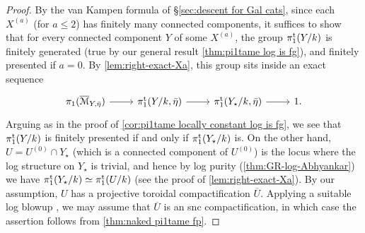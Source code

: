 \begin{proof}
By the van Kampen formula of \S\ref{sec:descent for Gal cats}, since each $X^{(a)}$ (for $a\leq 2$) has finitely many connected components, it suffices to show that for every connected component $Y$ of some $X^{(a)}$, the group $\pi_1^{\mathrm{t}}(Y/k)$ is finitely generated (true by our general result \cref{thm:pi1tame log is fg}), and finitely presented if $a=0$. By \cref{lem:right-exact-Xa}, this group sits inside an exact sequence 
\[
    \begin{tikzcd}
        \pi_1(\overline{\cM}_{Y,\bar\eta}) \ar[r] & \pitame(Y/k,\bar\eta)\ar[r] & \pitame(Y_\star/k,\bar\eta)\ar[r] & 1.
    \end{tikzcd}
\]
Arguing as in the proof of \cref{cor:pi1tame locally constant log is fg}, we see that $\pi_1^{\mathrm{t}}(Y/k)$ is finitely presented if and only if $\pi_1^{\mathrm{t}}(Y_\star/k)$ is. On the other hand, $U=U^{(0)}\cap Y_\star$ (which is a connected component of $U^{(0)}$) is the locus where the log structure on $Y_\star$ is trivial, and hence by log purity (\cref{thm:GR-log-Abhyankar}) we have $\pi_1^{\mathrm{t}}(Y_\star/k)\simeq \pi_1^{\mathrm{t}}(U/k)$ (see the proof of \cref{lem:right-exact-Xa}). By our assumption, $U$ has a projective toroidal compactification $\overline{U}$. Applying a suitable log blowup \cite{Niziol}, we may assume that $\overline{U}$ is an snc compactification, in which case the assertion follows from \cref{thm:naked pi1tame fp}.
\end{proof}

